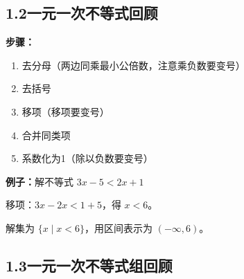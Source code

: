 \documentclass[12pt, a4paper]{ctexart}
\begin{document}
\subsection*{1.2\quad 一元一次不等式回顾}

\begin{knowledgebox}[一元一次不等式的解法]
\textbf{步骤：}
\begin{enumerate}[label=(\arabic*)]
  \item 去分母（两边同乘最小公倍数，注意乘负数要变号）
  \item 去括号
  \item 移项（移项要变号）
  \item 合并同类项
  \item 系数化为1（除以负数要变号）
\end{enumerate}

\textbf{例子：}解不等式 $3x - 5 < 2x + 1$

移项：$3x - 2x < 1 + 5$，得 $x < 6$。

解集为 $\{x \mid x < 6\}$，用区间表示为 $(-\infty, 6)$。
\end{knowledgebox}

\subsection*{1.3\quad 一元一次不等式组回顾}
\end{document}
